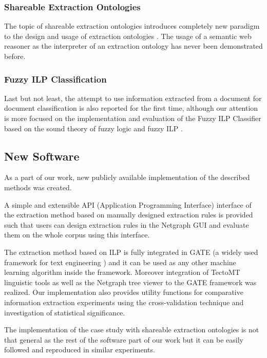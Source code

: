 \documentclass[12pt,a4paper,twoside,notitlepage]{article}
\begin{document}
\subsubsection{Shareable Extraction Ontologies}
The topic of shareable extraction ontologies introduces completely new paradigm to the design and usage of extraction ontologies \citep{DBLP:conf/er/EmbleyTL02}. The usage of a semantic web reasoner as the interpreter of an extraction ontology has never been demonstrated before.


\subsubsection{Fuzzy ILP Classification}
Last but not least, the attempt to use information extracted from a document for document classification is also reported for the first time, although our attention is more focused on the implementation and evaluation of the Fuzzy ILP Classifier based on the sound theory of fuzzy logic \citep{biblio:Hajek} and fuzzy ILP \citep{biblio:FILP}.



\subsection{New Software}

As a part of our work, new publicly available implementation of the described methods was created. 

A simple and extensible API (Application Programming Interface) interface of the extraction method based on manually designed extraction rules is provided such that users can design extraction rules in the Netgraph GUI and evaluate them on the whole corpus using this interface. 

The extraction method based on ILP is fully integrated in GATE (a widely used framework for text engineering \citep{biblio:GATE_ACL2002}) and it can be used as any other machine learning algorithm inside the framework. Moreover integration of TectoMT linguistic tools \citep{biblio:ZaPtTectoMTHighly2008} as well as the Netgraph tree viewer to the GATE framework was realized. Our implementation also provides utility functions for  comparative information extraction experiments using the cross-validation technique and investigation of statistical significance. 

The implementation of the case study with shareable extraction ontologies is not that general as the rest of the software part of our work but it can be easily followed and reproduced in similar experiments.
\end{document}

